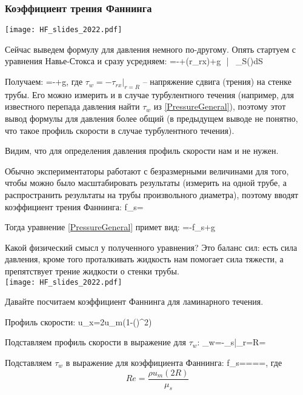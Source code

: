 \documentclass[main.tex]{subfiles}
\begin{document}
\subsubsection{Коэффициент трения Фаннинга}

\texttt{[image: HF\_slides\_2022.pdf]}

Сейчас выведем формулу для давления немного по-другому.
Опять стартуем с уравнения Навье-Стокса и сразу усредняем:
=-+\left(r\tau_{rx}\right)+\rho g \sin{\theta}\,\,\bigg|\,\,\,\,\,\int\limits_S(\cdot)dS
\eeq

Получаем:
\beq\label{PressureGeneral}
=-+\overline{\rho}g\sin{\theta},
\eeq
где $\tau_w=-\tau_{rx}|_{r=R}$ -- напряжение сдвига (трения) на стенке трубы.
Его можно измерить и в случае турбулентного течения (например, для известного перепада давления найти $\tau_w$ из \eqref{PressureGeneral}), поэтому этот вывод формулы для давления более общий (в предыдущем выводе не понятно, что такое профиль скорости в случае турбулентного течения).

Видим, что для определения давления профиль скорости нам и не нужен.

Обычно экспериментаторы работают с безразмерными величинами для того, чтобы можно было масштабировать результаты (измерить на одной трубе, а распространить результаты на трубы произвольного диаметра), поэтому вводят коэффициент трения Фаннинга:
\beq
f_s=
\eeq

Тогда уравнение \eqref{PressureGeneral} примет вид:
\beq
{}=-f_s+\rho g\sin{\theta}
\eeq

Какой физический смысл у полученного уравнения?
Это баланс сил: есть сила давления, кроме того проталкивать жидкость нам помогает сила тяжести, а препятствует трение жидкости о стенки трубы.
\\

\texttt{[image: HF\_slides\_2022.pdf]}

Давайте посчитаем коэффициент Фаннинга для ламинарного течения.

Профиль скорости:
\beq
u_x=2u_m\left(1-\left(\right)^2\right)
\eeq

Подставляем профиль скорости в выражение для $\tau_w$:
\beq
\tau_w=-\mu_s\bigg|_{r=R}=
\eeq

Подставляем $\tau_w$ в выражение для коэффициента Фаннинга:
\beq
f_s====,
\eeq
где
$$Re=\frac{\rho u_m(2R)}{\mu_s}$$
\end{document}
